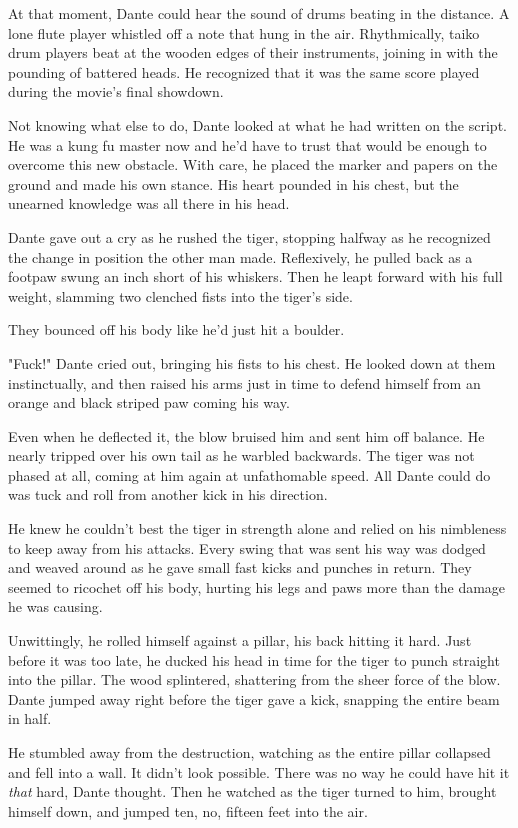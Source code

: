 At that moment, Dante could hear the sound of drums beating in the distance. A lone flute player whistled off a note that hung in the air. Rhythmically, taiko drum players beat at the wooden edges of their instruments, joining in with the pounding of battered heads. He recognized that it was the same score played during the movie's final showdown.

Not knowing what else to do, Dante looked at what he had written on the script. He was a kung fu master now and he'd have to trust that would be enough to overcome this new obstacle. With care, he placed the marker and papers on the ground and made his own stance. His heart pounded in his chest, but the unearned knowledge was all there in his head.

Dante gave out a cry as he rushed the tiger, stopping halfway as he recognized the change in position the other man made. Reflexively, he pulled back as a footpaw swung an inch short of his whiskers. Then he leapt forward with his full weight, slamming two clenched fists into the tiger's side.

They bounced off his body like he'd just hit a boulder.

"Fuck!" Dante cried out, bringing his fists to his chest. He looked down at them instinctually, and then raised his arms just in time to defend himself from an orange and black striped paw coming his way.

Even when he deflected it, the blow bruised him and sent him off balance. He nearly tripped over his own tail as he warbled backwards. The tiger was not phased at all, coming at him again at unfathomable speed. All Dante could do was tuck and roll from another kick in his direction.

He knew he couldn't best the tiger in strength alone and relied on his nimbleness to keep away from his attacks. Every swing that was sent his way was dodged and weaved around as he gave small fast kicks and punches in return. They seemed to ricochet off his body, hurting his legs and paws more than the damage he was causing.

Unwittingly, he rolled himself against a pillar, his back hitting it hard. Just before it was too late, he ducked his head in time for the tiger to punch straight into the pillar. The wood splintered, shattering from the sheer force of the blow. Dante jumped away right before the tiger gave a kick, snapping the entire beam in half.

He stumbled away from the destruction, watching as the entire pillar collapsed and fell into a wall. It didn't look possible. There was no way he could have hit it \emph{that} hard, Dante thought. Then he watched as the tiger turned to him, brought himself down, and jumped ten, no, fifteen feet into the air.

